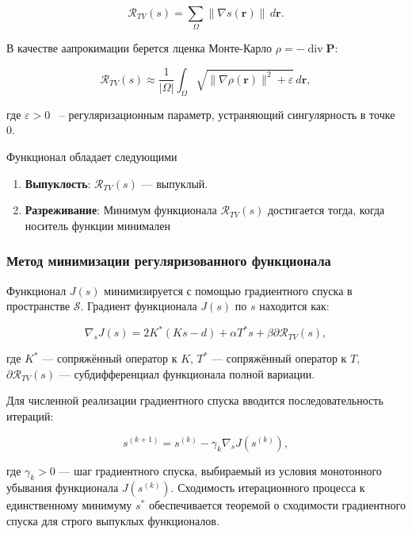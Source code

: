 \documentclass[a4paper,14pt,oneside,openany]{extarticle}
\begin{document}
\begin{equation}
    \mathcal{R}_{TV}(s) = \sum_{\Omega} \|\nabla s(\mathbf{r})\| \, d\mathbf{r}.
\end{equation}

В качестве аапрокимации берется лценка Монте-Карло $\rho = -\operatorname{div} \mathbf{P}$:

\begin{equation}
    \mathcal{R}_{TV}(s) \approx \frac{1}{|\Omega|} \int_{\Omega} \sqrt{\|\nabla \rho(\mathbf{r})\|^2 + \varepsilon} \, d\mathbf{r},
\end{equation}

где $\varepsilon > 0$ ~-- регуляризационным параметр, устраняющий сингулярность в точке 0.

Функционал обладает следующими
\begin{enumerate}
    \item \textbf{Выпуклость}: $\mathcal{R}_{TV}(s)$ --- выпуклый.
    \item \textbf{Разреживание}: Минимум функционала $\mathcal{R}_{TV}(s)$ достигается тогда, когда носитель функции минимален
\end{enumerate}

\subsubsection{Метод минимизации регуляризованного функционала}

Функционал $J(s)$ минимизируется с помощью градиентного спуска в пространстве $\mathcal{S}$. Градиент функционала $J(s)$ по $s$ находится как:

\begin{equation}
    \nabla_s J(s) = 2K^*(Ks - d) + \alpha T^* s + \beta \partial \mathcal{R}_{TV}(s),
\end{equation}

где $K^*$ --- сопряжённый оператор к $K$, $T^*$ --- сопряжённый оператор к $T$, $\partial \mathcal{R}_{TV}(s)$ --- субдифференциал функционала полной вариации.

Для численной реализации градиентного спуска вводится последовательность итераций:

\begin{equation}
    s^{(k+1)} = s^{(k)} - \gamma_k \nabla_s J(s^{(k)}),
\end{equation}

где $\gamma_k > 0$ --- шаг градиентного спуска, выбираемый из условия монотонного убывания функционала $J(s^{(k)})$. 
Сходимость итерационного процесса к единственному минимуму $s^*$ обеспечивается теоремой о сходимости 
градиентного спуска для строго выпуклых функционалов.
\end{document}
